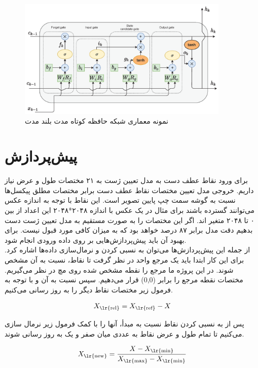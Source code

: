 \begin{figure}[h]
    \centering
    \includegraphics[width=0.9\textwidth]{LSTM.png}
    \caption{نمونه معماری شبکه‌ حافظه کوتاه مدت بلند مدت}
\end{figure}




\section{پیش‌پردازش}
برای ورود نقاط عطف دست به مدل تعیین ژست به ۲۱ مختصات طول و عرض نیاز داریم. خروجی مدل تعیین مختصات نقاط عطف دست برابر مختصات مطلق پیکسل‌ها نسبت به گوشه سمت 
چپ پایین تصویر است. این نقاط با توجه به اندازه عکس می‌توانند گسترده باشند برای مثال در یک عکس با اندازه ۲۰۴۸*۲۰۴۸ این اعداد از بین ۰ تا ۲۰۴۸ متغیر اند. 
اگر این مختصات را به صورت مستقیم به مدل تعیین ژست دست بدهیم دقت مدل برابر ۸۷ درصد خواهد بود که به میزان کافی مورد قبول نیست. برای بهبود آن باید پیش‌پردازش‌هایی بر روی داده ورودی انجام شود. 
\\
از جمله این پیش‌پردازش‌ها می‌توان به نسبی کردن و نرمال‌سازی داده‌ها اشاره کرد. برای این کار ابتدا باید یک مرجع واحد در نظر گرفت تا نقاط، نسبت به آن مشخص شوند. در این پروژه ما مرجع را نقطه 
مشخص شده روی مچ در نظر می‌گیریم. مختصات نقطه مرجع را برابر (0,0)  قرار می‌دهیم. سپس نسبت به آن و با توجه به فرمول زیر مختصات نقاط دیگر را به روز رسانی می‌کنیم.

\[ X_{\text{\lr{rel}}} = X_{\text{\lr{ref}}} - X \]


پس از به نسبی کردن نقاط نسبت به مبدأ، آنها را با کمک فرمول زیر نرمال سازی می‌کنیم تا تمام طول و عرض نقاط به عددی میان صفر و یک به روز رسانی شوند.

\[ X_{\text{\lr{new}}} = \frac{X - X_{\text{\lr{min}}}}{X_{\text{\lr{max}}} - X_{\text{\lr{min}}}} \]


